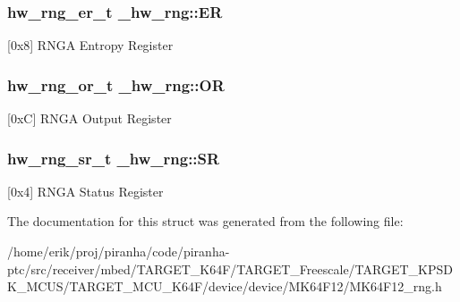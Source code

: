 \subsubsection[{\texorpdfstring{ER}{ER}}]{ {\bf hw\+\_\+rng\+\_\+er\+\_\+t} \+\_\+hw\+\_\+rng\+::\+ER}\hypertarget{struct__hw__rng_af101b103abe0f380514b23002f5e24ff}{}\label{struct__hw__rng_af101b103abe0f380514b23002f5e24ff}
\mbox{[}0x8\mbox{]} R\+N\+GA Entropy Register 
\subsubsection[{\texorpdfstring{OR}{OR}}]{ {\bf hw\+\_\+rng\+\_\+or\+\_\+t} \+\_\+hw\+\_\+rng\+::\+OR}\hypertarget{struct__hw__rng_a342ac91df2f30679bd1bf3daaaf3d495}{}\label{struct__hw__rng_a342ac91df2f30679bd1bf3daaaf3d495}
\mbox{[}0xC\mbox{]} R\+N\+GA Output Register 
\subsubsection[{\texorpdfstring{SR}{SR}}]{ {\bf hw\+\_\+rng\+\_\+sr\+\_\+t} \+\_\+hw\+\_\+rng\+::\+SR}\hypertarget{struct__hw__rng_a5c6bd10c3da46c2f4fd216c77181b091}{}\label{struct__hw__rng_a5c6bd10c3da46c2f4fd216c77181b091}
\mbox{[}0x4\mbox{]} R\+N\+GA Status Register 

The documentation for this struct was generated from the following file\+:\begin{DoxyCompactItemize}
\item 
/home/erik/proj/piranha/code/piranha-\/ptc/src/receiver/mbed/\+T\+A\+R\+G\+E\+T\+\_\+\+K64\+F/\+T\+A\+R\+G\+E\+T\+\_\+\+Freescale/\+T\+A\+R\+G\+E\+T\+\_\+\+K\+P\+S\+D\+K\+\_\+\+M\+C\+U\+S/\+T\+A\+R\+G\+E\+T\+\_\+\+M\+C\+U\+\_\+\+K64\+F/device/device/\+M\+K64\+F12/M\+K64\+F12\+\_\+rng.\+h\end{DoxyCompactItemize}
